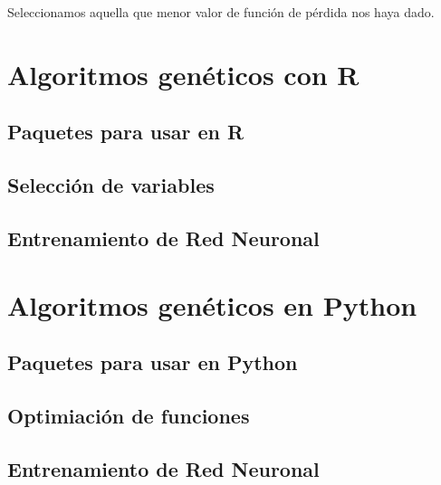 \documentclass[
  a4paper,
  DIV=11,
  numbers=noendperiod]{scrreprt}
\begin{document}
Seleccionamos aquella que menor valor de función de pérdida nos haya
dado.

\section{Algoritmos genéticos con
R}\label{algoritmos-genuxe9ticos-con-r}

\subsection{Paquetes para usar en R}\label{paquetes-para-usar-en-r}

\subsection{Selección de variables}\label{selecciuxf3n-de-variables}

\subsection{Entrenamiento de Red
Neuronal}\label{entrenamiento-de-red-neuronal-1}

\section{Algoritmos genéticos en
Python}\label{algoritmos-genuxe9ticos-en-python}

\subsection{Paquetes para usar en
Python}\label{paquetes-para-usar-en-python}

\subsection{Optimiación de funciones}\label{optimiaciuxf3n-de-funciones}

\subsection{Entrenamiento de Red
Neuronal}\label{entrenamiento-de-red-neuronal-2}
\end{document}
